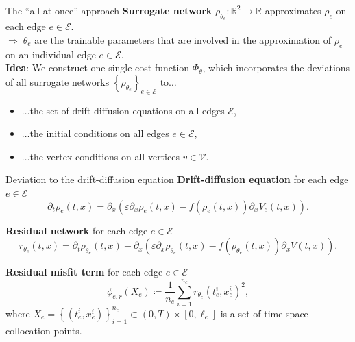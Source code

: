 \documentclass[9pt]{beamer}
\begin{document}
\begin{frame}{The “all at once” approach}
    \textbf{Surrogate network} $\rho_{\theta_e} \colon \mathbb{R}^2 \to \mathbb{R}$ approximates $\rho_e$ on each edge $e \in \mathcal{E}$. \\
    $\Rightarrow \; \theta_e$ are the trainable parameters that are involved in the approximation of $\rho_e$ on an individual edge $e \in \mathcal{E}$. \\
    \vspace{7mm}
    \textbf{Idea}: We construct one single cost function $\Phi_{\theta}$, which incorporates the deviations of all surrogate networks $\left\{\rho_{\theta_e} \right\}_{e \in \mathcal{E}}$ to$\ldots$
    \begin{itemize}
        \item $\ldots$the set of drift-diffusion equations on all edges $\mathcal{E}$,
        \item $\ldots$the initial conditions on all edges $e \in \mathcal{E}$,
        \item $\ldots$the vertex conditions on all vertices $v \in \mathcal{V}$.
    \end{itemize} 
\end{frame}



\begin{frame}{Deviation to the drift-diffusion equation}
    \textbf{Drift-diffusion equation} for each edge $e \in \mathcal{E}$
    \begin{equation*} 
        \partial_t \rho_e  \left( t,x \right)  = \partial_x  \left( \varepsilon \partial_x \rho_e  \left( t,x \right)  - f \left( \rho_e  \left( t,x \right)   \right)  \partial_x V_e  \left( t,x \right)  \right).
    \end{equation*}

    \vspace{3mm}

    \textbf{Residual network} for each edge $e \in \mathcal{E}$
    \begin{equation*}
        r_{\theta_e} \left( t,x \right)=\partial_t \rho_{\theta_e} \left( t,x \right) - \partial_x   \left(  \varepsilon \partial_x  \rho_{\theta_e} \left( t,x \right) - f \left( \rho_{\theta_e} \left( t,x \right) \right) \partial_x V \left( t,x \right) \right).
    \end{equation*}

    \vspace{3mm}

    \textbf{Residual misfit term} for each edge $e \in \mathcal{E}$
    \begin{equation*} 
        \phi_{e,r}  \left( X_e \right) \coloneqq \frac{1}{n_e} \sum_{i=1}^{n_e} r_{\theta_e}  \left( t_e^i, x_e^i  \right)^2,
    \end{equation*} 
    where $X_e = \left\{ \left( t_e^i, x_e^i \right) \right\}_{i=1}^{n_e} \subset \left( 0, T \right) \times \left[0, \ell_e\right]$ is a set of time-space collocation points. \\
\end{frame}
\end{document}
